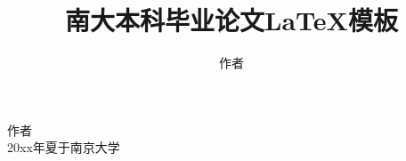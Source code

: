 \documentclass[winfonts,bachelor,twoside]{njuthesis}
\title{南大本科毕业论文\LaTeX 模板}
\title{} %
\author{作者}
\institute{南京大学}
\begin{document}

\maketitle
\makeenglishtitle


\frontmatter

\begin{abstract}
\lipsum[1-2]


\end{abstract}

\begin{englishabstract}
\lipsum[2]


\end{englishabstract}

%
\begin{preface}
\lipsum[1]
\vspace{1cm}
\begin{flushright}
作者\\
20xx年夏于南京大学
\end{flushright}

\end{preface}

\tableofcontents

\listoffigures

\listoftables
\end{document}
